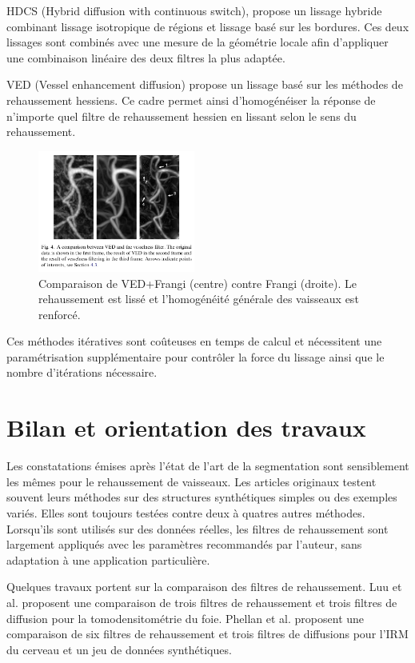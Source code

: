 HDCS \cite{Mendrik2009_HDCS} (Hybrid diffusion with continuous switch), propose un lissage hybride combinant lissage isotropique de régions et lissage basé sur les bordures. Ces deux lissages sont combinés avec une mesure de la géométrie locale afin d'appliquer une combinaison linéaire des deux filtres la plus adaptée.

VED \cite{Manniesing2006_VED} (Vessel enhancement diffusion) propose un lissage basé sur les méthodes de rehaussement hessiens. Ce cadre permet ainsi d'homogénéiser la réponse de n'importe quel filtre de rehaussement hessien en lissant selon le sens du rehaussement.

\begin{figure}[ht]
  \centering
  \includegraphics[height=4cm]{Images/VED.png}
  \caption{Comparaison de VED+Frangi (centre) contre Frangi (droite). Le rehaussement est lissé et l'homogénéité générale des vaisseaux est renforcé.}
  \label{fig:custom_fig}
\end{figure}

Ces méthodes itératives sont coûteuses en temps de calcul et nécessitent une paramétrisation supplémentaire pour contrôler la force du lissage ainsi que le nombre d'itérations nécessaire.

\section{Bilan et orientation des travaux}
\label{sec:EA:bilan}

Les constatations émises après l'état de l'art de la segmentation sont sensiblement les mêmes pour le rehaussement de vaisseaux. Les articles originaux testent souvent leurs méthodes sur des structures synthétiques simples ou des exemples variés. Elles sont toujours testées contre deux à quatres autres méthodes. Lorsqu'ils sont utilisés sur des données réelles, les filtres de rehaussement sont largement appliqués avec les paramètres recommandés par l'auteur, sans adaptation à une application particulière.

Quelques travaux portent sur la comparaison des filtres de rehaussement. Luu et al. \cite{Luu2015_liver_vesselness_comparison} proposent une comparaison de trois filtres de rehaussement et trois filtres de diffusion pour la tomodensitométrie du foie. Phellan et al. \cite{Phellan2017_Brain_vesselness_comparison} proposent une comparaison de six filtres de rehaussement et trois filtres de diffusions pour l'IRM du cerveau et un jeu de données synthétiques.

